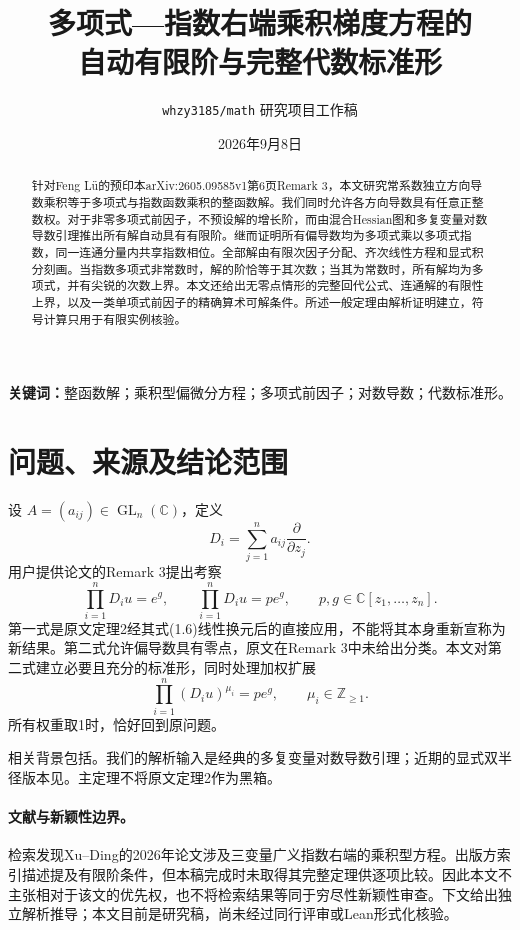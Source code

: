 \documentclass[UTF8,a4paper,zihao=-4,fontset=none]{ctexart}
\title{多项式—指数右端乘积梯度方程的\texorpdfstring{\\}{ }自动有限阶与完整代数标准形}
\author{\texttt{whzy3185/math} 研究项目工作稿}
\date{2026年9月8日}
\numberwithin{equation}{section}
\theoremstyle{definition}
\theoremstyle{definition}\newtheorem{definition}[theorem]{定义}
\newcommand{\C}{\mathbb C}
\begin{document}
\maketitle
\begin{abstract}
针对Feng L\"u的预印本arXiv:2605.09585v1第6页Remark 3，本文研究常系数独立方向导数乘积等于多项式与指数函数乘积的整函数解。我们同时允许各方向导数具有任意正整数权。对于非零多项式前因子，不预设解的增长阶，而由混合Hessian图和多复变量对数导数引理推出所有解自动具有有限阶。继而证明所有偏导数均为多项式乘以多项式指数，同一连通分量内共享指数相位。全部解由有限次因子分配、齐次线性方程和显式积分刻画。当指数多项式非常数时，解的阶恰等于其次数；当其为常数时，所有解均为多项式，并有尖锐的次数上界。本文还给出无零点情形的完整回代公式、连通解的有限性上界，以及一类单项式前因子的精确算术可解条件。所述一般定理由解析证明建立，符号计算只用于有限实例核验。
\end{abstract}
\noindent\textbf{关键词：}整函数解；乘积型偏微分方程；多项式前因子；对数导数；代数标准形。

\section{问题、来源及结论范围}
设 $A=(a_{ij})\in\operatorname{GL}_n(\C)$，定义
\[
 D_i=\sum_{j=1}^n a_{ij}\frac{\partial}{\partial z_j}.
\]
用户提供论文\cite{Lu2026}的Remark 3提出考察
\begin{equation}\label{eq:source}
 \prod_{i=1}^nD_iu=e^g,\qquad
 \prod_{i=1}^nD_iu=p e^g,
 \qquad p,g\in\C[z_1,\ldots,z_n].
\end{equation}
第一式是原文定理2经其式(1.6)线性换元后的直接应用，不能将其本身重新宣称为新结果。第二式允许偏导数具有零点，原文在Remark 3中未给出分类。本文对第二式建立必要且充分的标准形，同时处理加权扩展
\begin{equation}\label{eq:weighted}
 \prod_{i=1}^n(D_iu)^{\mu_i}=p e^g,
 \qquad\mu_i\in\mathbb Z_{\ge1}.
\end{equation}
所有权重取1时，恰好回到原问题。

相关背景包括\cite{ChenHan2022,XuLiuXuan2025,LuMa2026}。我们的解析输入是经典的多复变量对数导数引理\cite{Vitter1977}；近期的显式双半径版本见\cite{HanLiu2025}。主定理不将原文定理2作为黑箱。

\paragraph{文献与新颖性边界。}
检索发现Xu--Ding的2026年论文\cite{XuDing2026}涉及三变量广义指数右端的乘积型方程。出版方索引描述提及有限阶条件，但本稿完成时未取得其完整定理供逐项比较。因此本文不主张相对于该文的优先权，也不将检索结果等同于穷尽性新颖性审查。下文给出独立解析推导；本文目前是研究稿，尚未经过同行评审或Lean形式化核验。
\end{document}
